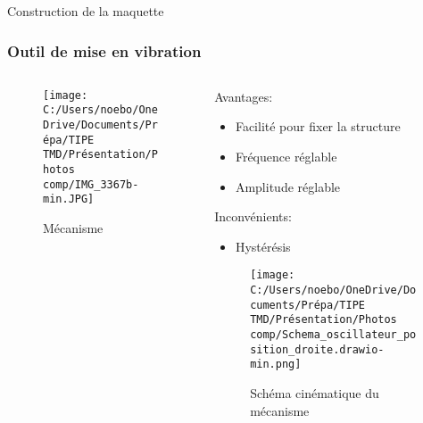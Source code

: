 \documentclass{beamer}
\begin{document}
	
	\begin{frame}{Construction de la maquette}
		\frametitle{Outil de mise en vibration}
 
		\begin{columns}
			\begin{column}{0.5\textwidth}
				\begin{figure}
					\texttt{[image: C:/Users/noebo/OneDrive/Documents/Prépa/TIPE TMD/Présentation/Photos comp/IMG\_3367b-min.JPG]}
					\caption{Mécanisme}
				\end{figure}
			\end{column}
			\begin{column}{0.5\textwidth}
				Avantages:
				\begin{itemize}
					\item Facilité pour fixer la structure
					\item Fréquence réglable \\
					\item Amplitude réglable 
				\end{itemize}
				Inconvénients:
				
				\begin{itemize}
					\item Hystérésis
				\end{itemize}
			\vspace{12 pt}
					\begin{figure}
				\texttt{[image: C:/Users/noebo/OneDrive/Documents/Prépa/TIPE TMD/Présentation/Photos comp/Schema\_oscillateur\_position\_droite.drawio-min.png]}
				\caption{Schéma cinématique du mécanisme}
			\end{figure}
			\end{column}
		\end{columns}

	\end{frame}

\end{document}
